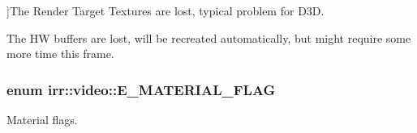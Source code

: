 \begin{Desc}
\begin{description}
{}]The Render Target Textures are lost, typical problem for D3D. \item[{\em 
E\+L\+R\+\_\+\+H\+W\+\_\+\+B\+U\+F\+F\+E\+RS\hypertarget{namespaceirr_1_1video_a5b423450f4c1775bfdc86b5998c3db72aababdf6d3357bb40f416cd76d25c7bcc}{}\label{namespaceirr_1_1video_a5b423450f4c1775bfdc86b5998c3db72aababdf6d3357bb40f416cd76d25c7bcc}
}]The HW buffers are lost, will be recreated automatically, but might require some more time this frame. \end{description}
\end{Desc}
\subsubsection[{\texorpdfstring{E\+\_\+\+M\+A\+T\+E\+R\+I\+A\+L\+\_\+\+F\+L\+AG}{E\_MATERIAL\_FLAG}}]{\setlength{\rightskip}{0pt plus 5cm}enum {\bf irr\+::video\+::\+E\+\_\+\+M\+A\+T\+E\+R\+I\+A\+L\+\_\+\+F\+L\+AG}}\hypertarget{namespaceirr_1_1video_a8a3bc00ae8137535b9fbc5f40add70d3}{}\label{namespaceirr_1_1video_a8a3bc00ae8137535b9fbc5f40add70d3}


Material flags. 


